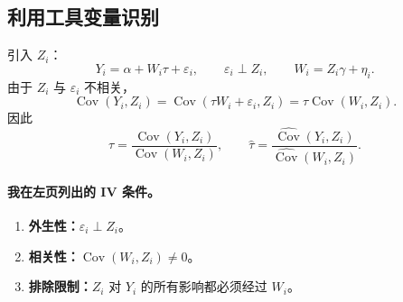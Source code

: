 \subsection{利用工具变量识别}
引入 $Z_i$：
\[
 Y_i=\alpha+W_i\tau+\varepsilon_i,\qquad\varepsilon_i\perp Z_i,
 \qquad W_i=Z_i\gamma+\eta_i.\tag{9.4}
\]
由于 $Z_i$ 与 $\varepsilon_i$ 不相关，
\[
 \operatorname{Cov}(Y_i,Z_i)
 =\operatorname{Cov}(\tau W_i+\varepsilon_i,Z_i)
 =\tau\operatorname{Cov}(W_i,Z_i).
\]
因此
\[
 \tau=\frac{\operatorname{Cov}(Y_i,Z_i)}{\operatorname{Cov}(W_i,Z_i)},
 \qquad
 \widehat\tau=\frac{\widehat{\operatorname{Cov}}(Y_i,Z_i)}
 {\widehat{\operatorname{Cov}}(W_i,Z_i)}.
\]

\paragraph{我在左页列出的 IV 条件。}
\begin{enumerate}
 \item \textbf{外生性：}$\varepsilon_i\perp Z_i$。
 \item \textbf{相关性：}$\operatorname{Cov}(W_i,Z_i)\ne0$。
 \item \textbf{排除限制：}$Z_i$ 对 $Y_i$ 的所有影响都必须经过 $W_i$。
\end{enumerate}
\begin{center}\end{center}


